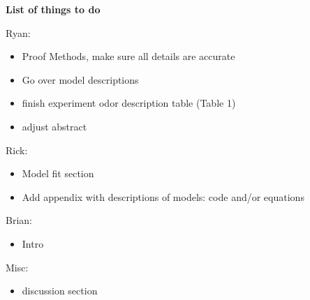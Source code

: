 \textbf{List of things to do}

Ryan:
\begin{itemize}
\item Proof Methods, make sure all details are accurate
\item Go over model descriptions
\item finish experiment odor description table (Table 1)
\item adjust abstract
\end{itemize}
Rick:
\begin{itemize}
\item Model fit section
\item Add appendix with descriptions of models: code and/or equations
\end{itemize}

Brian:
\begin{itemize}
\item Intro
\end{itemize}

Misc:
\begin{itemize}
\item discussion section
\end{itemize}
